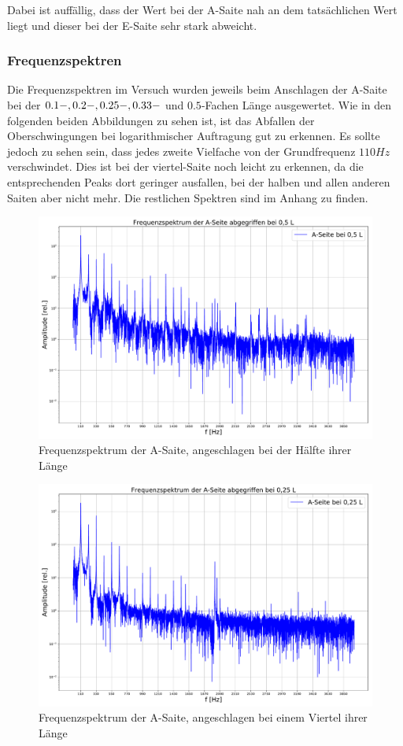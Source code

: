 \documentclass[a4paper, 11pt]{article}
\begin{document}
Dabei ist auffällig, dass der Wert bei der A-Saite nah an dem tatsächlichen Wert liegt und dieser bei der E-Saite sehr stark abweicht.


\subsubsection{Frequenzspektren}
Die Frequenzspektren im Versuch wurden jeweils beim Anschlagen der A-Saite bei der $0.1-, \\0.2-, 0.25-, 0.33-$ und $0.5$-Fachen Länge ausgewertet.
Wie in den folgenden beiden Abbildungen zu sehen ist, ist das Abfallen der Oberschwingungen bei logarithmischer Auftragung gut zu erkennen. Es sollte jedoch zu sehen sein, dass jedes zweite Vielfache von der Grundfrequenz $110 Hz$ verschwindet. Dies ist bei der viertel-Saite noch leicht zu erkennen, da die entsprechenden Peaks dort geringer ausfallen, bei der halben und allen anderen Saiten aber nicht mehr. Die restlichen Spektren sind im Anhang zu finden.

\begin{figure}[H]
	\centering
	\includegraphics[scale=0.35]{../Plots/A-0,5.pdf}
	\caption{Frequenzspektrum der A-Saite, angeschlagen bei der Hälfte ihrer Länge}
	\label{fig:A-0,5}
\end{figure}

\begin{figure}[H]
	\centering
	\includegraphics[scale=0.35]{../Plots/A-0,25.pdf}
	\caption{Frequenzspektrum der A-Saite, angeschlagen bei einem Viertel ihrer Länge}
	\label{fig:A-0,25}
\end{figure}
\end{document}
